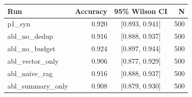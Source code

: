\begin{tabular}{lrcr}
\toprule
Run & Accuracy & 95\% Wilson CI & N \\
\midrule
p1_syn & 0.920 & [0.893, 0.941] & 500 \\
abl_no_dedup & 0.916 & [0.888, 0.937] & 500 \\
abl_no_budget & 0.924 & [0.897, 0.944] & 500 \\
abl_vector_only & 0.906 & [0.877, 0.929] & 500 \\
abl_naive_rag & 0.916 & [0.888, 0.937] & 500 \\
abl_summary_only & 0.908 & [0.879, 0.930] & 500 \\
\bottomrule
\end{tabular}
